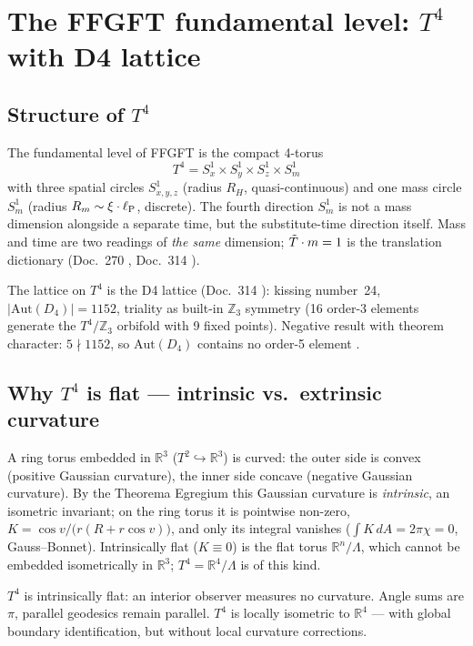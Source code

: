 \section{The FFGFT fundamental level: $T^4$ with D4 lattice}
\label{sec:t4}

\subsection{Structure of $T^4$}

The fundamental level of FFGFT is the compact 4-torus
\[
  T^4 = S^1_x \times S^1_y \times S^1_z \times S^1_m
\]
with three spatial circles $S^1_{x,y,z}$ (radius $R_H$,
quasi-continuous) and one mass circle $S^1_m$
(radius $R_m \sim \xi\cdot\ell_{\mathrm{P}}$, discrete).
The fourth direction $S^1_m$ is not a mass dimension alongside
a separate time, but the substitute-time direction itself.
Mass and time are two readings of \emph{the same} dimension;
$\tilde{T}\cdot m = 1$ is the translation dictionary (Doc.~270 \K,
Doc.~314 \K). \SETZ

The lattice on $T^4$ is the D4 lattice (Doc.~314 \K):
kissing number~24, $|\text{Aut}(D_4)| = 1152$, triality as
built-in $\mathbb{Z}_3$ symmetry (16 order-3 elements generate
the $T^4/\mathbb{Z}_3$ orbifold with 9 fixed points).
Negative result with theorem character: $5\nmid 1152$, so
$\text{Aut}(D_4)$ contains no order-5 element \K.

\subsection{Why $T^4$ is flat — intrinsic vs.\ extrinsic curvature \K}
\label{sec:flat}

A ring torus embedded in $\mathbb{R}^3$ ($T^2 \hookrightarrow
\mathbb{R}^3$) is curved: the outer side is convex (positive Gaussian
curvature), the inner side concave (negative Gaussian curvature). By
the Theorema Egregium this Gaussian curvature is \emph{intrinsic}, an
isometric invariant; on the ring torus it is pointwise non-zero,
$K = \cos v/\bigl(r(R + r\cos v)\bigr)$, and only its integral vanishes
($\int K\,dA = 2\pi\chi = 0$, Gauss--Bonnet). Intrinsically flat
($K \equiv 0$) is the flat torus $\mathbb{R}^n/\Lambda$, which cannot be
embedded isometrically in $\mathbb{R}^3$; $T^4 = \mathbb{R}^4/\Lambda$
is of this kind.

\begin{tcolorbox}[ffgftbox,title={Intrinsically flat torus \K}]
  $T^4$ is intrinsically flat: an interior observer measures no
  curvature. Angle sums are $\pi$, parallel geodesics remain
  parallel. $T^4$ is locally isometric to $\mathbb{R}^4$ —
  with global boundary identification, but without local
  curvature corrections.
\end{tcolorbox}

